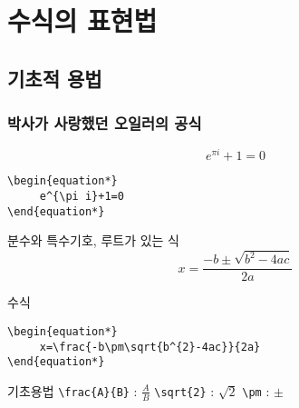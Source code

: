 \documentclass{beamer}
\begin{document}
\section{수식의 표현법}

\subsection{기초적 용법}

\begin{frame}[fragile]
\frametitle{박사가 사랑했던 오일러의 공식}

\begin{block}{}
\begin{equation*}
     e^{\pi i}+1=0
\end{equation*}
\end{block}

\begin{block}{}
\begin{center}
\begin{verbatim}
\begin{equation*}
     e^{\pi i}+1=0
\end{equation*}
\end{verbatim}
\end{center}
\end{block}

\end{frame}


\begin{frame}[fragile]
\begin{block}{분수와 특수기호, 루트가 있는 식}
\begin{equation*}
     x=\frac{-b\pm\sqrt{b^{2}-4ac}}{2a}
\end{equation*}
\end{block}


\begin{block}{수식}
\begin{center}
\begin{verbatim}
\begin{equation*}
     x=\frac{-b\pm\sqrt{b^{2}-4ac}}{2a}
\end{equation*}
\end{verbatim}
\end{center}
\end{block}

\begin{block}{기초용법}
\verb!\frac{A}{B}! : $\frac{A}{B}$ \qquad\verb!\sqrt{2}! : $\sqrt{2}$ \qquad\verb!\pm! : $\pm$
\end{block}
\end{frame}
\end{document}
